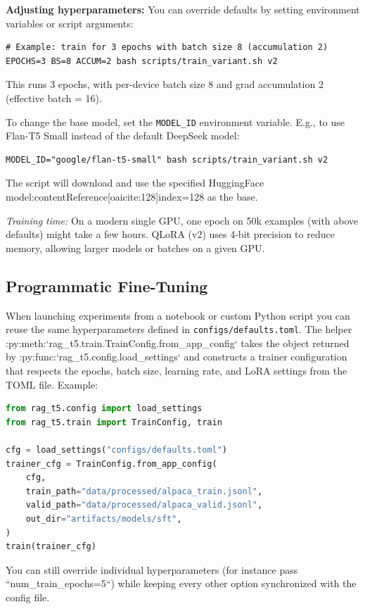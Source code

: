 \documentclass{article}
\begin{document}
\textbf{Adjusting hyperparameters:} You can override defaults by setting environment variables or script arguments:
\begin{verbatim}
# Example: train for 3 epochs with batch size 8 (accumulation 2)
EPOCHS=3 BS=8 ACCUM=2 bash scripts/train_variant.sh v2
\end{verbatim}
This runs 3 epochs, with per-device batch size 8 and grad accumulation 2 (effective batch = 16). 

To change the base model, set the \texttt{MODEL\_ID} environment variable. E.g., to use Flan-T5 Small instead of the default DeepSeek model:
\begin{verbatim}
MODEL_ID="google/flan-t5-small" bash scripts/train_variant.sh v2
\end{verbatim}
The script will download and use the specified HuggingFace model:contentReference[oaicite:128]{index=128} as the base.

\emph{Training time:} On a modern single GPU, one epoch on 50k examples (with above defaults) might take a few hours. QLoRA (v2) uses 4-bit precision to reduce memory, allowing larger models or batches on a given GPU.

\subsection*{Programmatic Fine-Tuning}
When launching experiments from a notebook or custom Python script you can reuse the same hyperparameters defined in \texttt{configs/defaults.toml}. The helper :py:meth:`rag\_t5.train.TrainConfig.from\_app\_config` takes the object returned by :py:func:`rag\_t5.config.load\_settings` and constructs a trainer configuration that respects the epochs, batch size, learning rate, and LoRA settings from the TOML file. Example:
\begin{lstlisting}[language=Python]
from rag_t5.config import load_settings
from rag_t5.train import TrainConfig, train

cfg = load_settings("configs/defaults.toml")
trainer_cfg = TrainConfig.from_app_config(
    cfg,
    train_path="data/processed/alpaca_train.jsonl",
    valid_path="data/processed/alpaca_valid.jsonl",
    out_dir="artifacts/models/sft",
)
train(trainer_cfg)
\end{lstlisting}
You can still override individual hyperparameters (for instance pass ``num_train_epochs=5``) while keeping every other option synchronized with the config file.
\end{document}
